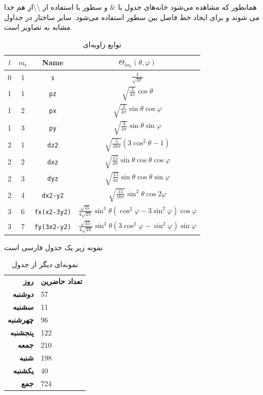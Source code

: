 همانطور که مشاهده می‌شود خانه‌های جدول با \& و سطور با استفاده از \textbackslash\textbackslash از هم جدا می شوند و  برای ایجاد خط فاصل بین سطور استفاده می‌شود. سایر ساختار در جداول مشابه به تصاویر است.
\begin{table}[h]
\begin{center}
\renewcommand{\arraystretch}{0.6}
\begin{latin}
\begin{tabular}{|c|c|c|c|}
\hline
$l$ & $m_{\mathrm{r}}$ & Name & $\Theta_{lm_{\mathrm{r}}}(\theta,\varphi)$ \\\hline
 0  &  1  &  \verb#s#   & $\frac{1}{\sqrt{4\pi}}$ \\\hline
 1  &  1  &  \verb#pz#  & $\sqrt{\frac{3}{4\pi}}\cos\theta$ \\\hline
 1  &  2  &  \verb#px#  & $\sqrt{\frac{3}{4\pi}}\sin\theta\cos\varphi$ \\\hline
 1  &  3  &  \verb#py#  & $\sqrt{\frac{3}{4\pi}}\sin\theta\sin\varphi$ \\\hline
 2  &  1  &  \verb#dz2# &$\sqrt{\frac{5}{16\pi}}(3\cos^{2}\theta -1)$ \\\hline
 2  &  2  &  \verb#dxz# & $\sqrt{\frac{15}{4\pi}}\sin\theta\cos\theta\cos\varphi$ \\\hline
 2  &  3  &  \verb#dyz# &$\sqrt{\frac{15}{4\pi}}\sin\theta\cos\theta\sin\varphi$ \\\hline
 2  &  4  &  \verb#dx2-y2# &$\sqrt{\frac{15}{16\pi}}\sin^{2}\theta\cos2\varphi$ \\\hline
 3  &  6  &  \verb#fx(x2-3y2)# & $\frac{\sqrt{35}}{4\sqrt{2\pi}}\sin^{3}\theta(\cos^{2}\varphi-3\sin^{2}\varphi)\cos\varphi$\\\hline
 3  &  7  &  \verb#fy(3x2-y2)# & $\frac{\sqrt{35}}{4\sqrt{2\pi}}\sin^{3}\theta(3\cos^{2}\varphi-\sin^{2}\varphi)\sin\varphi$\\\hline
\end{tabular}
\end{latin}
\caption{توابع زاویه‌ای}
\label{tab:angular}
\end{center}
\end{table}

نمونه زیر یک جدول فارسی است
\begin{table}[h]
\begin{center}
 \begin{tabular}
    {>{\columncolor{blue}\color{white}\bfseries}rl}
\rowcolor[gray]{0.8}
    \color{black} روز & \bfseries تعداد حاضرین\\[2pt]
دوشنبه&    57 \\  سشنبه&   11 \\
چهرشنبه& 96 \\  پنجشنبه& 122 \\
جمعه&   210 \\  شنبه& 198 \\
یکشنبه&    40 \\
\cellcolor[gray]{0.8}\color{black}جمع& 724
\end{tabular}
\caption{نمونه‌ای دیگر از جدول}
 \end{center}
\end{table}


